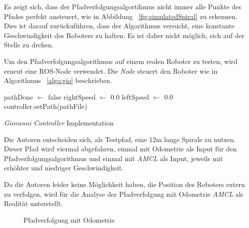 \documentclass[11pt,a4paper]{article}
\begin{document}
{\begin{figure}[h]
\end{figure}
Es zeigt sich, dass der Pfadverfolgungsalgortihmus nicht immer alle Punkte des Pfades perfekt ansteuert, wie in Abbildung ~\ref{fig:simulatedSpiral} zu erkennen. Dies ist darauf zur\"uckuf\"uhren, dass der Algorithmus versucht, eine konstante Geschwindigkeit des Roboters zu halten. Es ist daher nicht m\"oglich, sich auf der Stelle zu drehen.


\newpage
Um den Pfadverfolgungsalgorithmus auf einem realen Roboter zu testen, wird erneut eine ROS-Node verwendet. Die \textit{Node} steuert den Roboter wie in Algorithmus ~\ref{algo:gio} beschrieben.

\begin{algorithm}
	pathDone $\leftarrow$ false\;
	rightSpeed $\leftarrow$ 0.0\;
	leftSpeed $\leftarrow$ 0.0\;
	controller.setPath(pathFile)\;
\caption{\textit{Giovanni Controller} Implementation \label{algo:gio}}
\end{algorithm}

Die Autoren entscheiden sich, als Testpfad, eine 12m lange Spirale zu nutzen. Dieser Pfad wird viermal abgefahren, einmal mit Odometrie als Input f\"ur den Pfadverfolgungsalgorithmus und einmal mit \textit{AMCL} als Input, jeweils mit erh\"ohter und niedriger Geschwindigkeit.

Da die Autoren leider keine M\"oglichkeit haben, die Position des Roboters extern zu verfolgen, wird f\"ur die Analyse der Pfadverfolgung mit Odometrie \textit{AMCL} als Realit\"at unterstellt.
\newpage
\begin{figure}
	\centering
	\caption{Pfadverfolgung mit Odometrie}
\end{figure}

}
\end{document}
